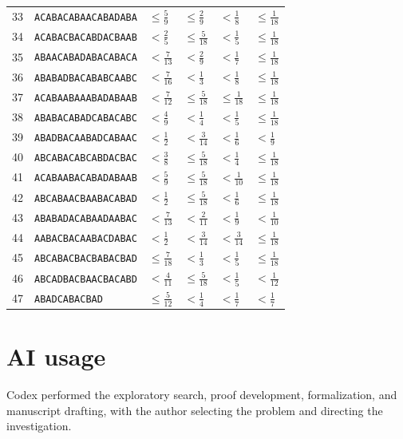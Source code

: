 \documentclass[11pt]{article}
\begin{document}
\begin{longtable}{rlllll}
33 & \texttt{ACABACABAACABADABA} & $\leq \frac{5}{9}$ & $\leq \frac{2}{9}$ & $< \frac{1}{8}$ & $\leq \frac{1}{18}$ \\
34 & \texttt{ACABACBACABDACBAAB} & $< \frac{2}{5}$ & $\leq \frac{5}{18}$ & $< \frac{1}{5}$ & $\leq \frac{1}{18}$ \\
35 & \texttt{ABAACABADABACABACA} & $< \frac{7}{13}$ & $< \frac{2}{9}$ & $< \frac{1}{7}$ & $\leq \frac{1}{18}$ \\
36 & \texttt{ABABADBACABABCAABC} & $< \frac{7}{16}$ & $< \frac{1}{3}$ & $< \frac{1}{8}$ & $\leq \frac{1}{18}$ \\
37 & \texttt{ACABAABAAABADABAAB} & $< \frac{7}{12}$ & $\leq \frac{5}{18}$ & $\leq \frac{1}{18}$ & $\leq \frac{1}{18}$ \\
38 & \texttt{ABABACABADCABACABC} & $< \frac{4}{9}$ & $< \frac{1}{4}$ & $< \frac{1}{5}$ & $\leq \frac{1}{18}$ \\
39 & \texttt{ABADBACAABADCABAAC} & $< \frac{1}{2}$ & $< \frac{3}{14}$ & $< \frac{1}{6}$ & $< \frac{1}{9}$ \\
40 & \texttt{ABCABACABCABDACBAC} & $< \frac{3}{8}$ & $\leq \frac{5}{18}$ & $< \frac{1}{4}$ & $\leq \frac{1}{18}$ \\
41 & \texttt{ACABAABACABADABAAB} & $< \frac{5}{9}$ & $\leq \frac{5}{18}$ & $< \frac{1}{10}$ & $\leq \frac{1}{18}$ \\
42 & \texttt{ABCABAACBAABACABAD} & $< \frac{1}{2}$ & $\leq \frac{5}{18}$ & $< \frac{1}{6}$ & $\leq \frac{1}{18}$ \\
43 & \texttt{ABABADACABAADAABAC} & $< \frac{7}{13}$ & $< \frac{2}{11}$ & $< \frac{1}{9}$ & $< \frac{1}{10}$ \\
44 & \texttt{AABACBACAABACDABAC} & $< \frac{1}{2}$ & $< \frac{3}{14}$ & $< \frac{3}{14}$ & $\leq \frac{1}{18}$ \\
45 & \texttt{ABCABACBACBABACBAD} & $\leq \frac{7}{18}$ & $< \frac{1}{3}$ & $< \frac{1}{5}$ & $\leq \frac{1}{18}$ \\
46 & \texttt{ABCADBACBAACBACABD} & $< \frac{4}{11}$ & $\leq \frac{5}{18}$ & $< \frac{1}{5}$ & $< \frac{1}{12}$ \\
47 & \texttt{ABADCABACBAD} & $\leq \frac{5}{12}$ & $< \frac{1}{4}$ & $< \frac{1}{7}$ & $< \frac{1}{7}$ \\
\bottomrule
\end{longtable}
\endgroup

\section{AI usage}\label{app:ai}
Codex performed the exploratory search, proof development, formalization, and manuscript drafting, with the author selecting the problem and directing the investigation.
\end{document}
